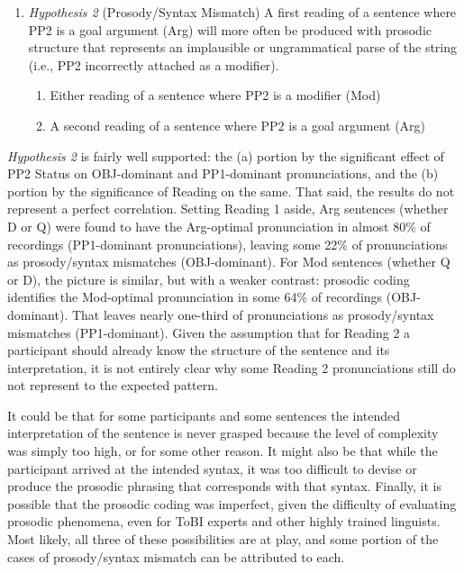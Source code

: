 \documentclass[11pt,oneside]{book}
\providecommand{\tightlist}{%
  \setlength{\itemsep}{0pt}\setlength{\parskip}{0pt}}
\begin{document}
\begin{enumerate}
\def\labelenumi{(\arabic{enumi})}
\setcounter{enumi}{42}
\tightlist
\item
  \emph{Hypothesis 2} (Prosody/Syntax Mismatch)\linebreak\nopagebreak
  A first reading of a sentence where PP2 is a goal argument (Arg) will more often be produced with prosodic structure that represents an implausible or ungrammatical parse of the string (i.e., PP2 incorrectly attached as a modifier).

  \begin{enumerate}
  \def\labelenumii{\alph{enumii}.}
  \tightlist
  \item
    Either reading of a sentence where PP2 is a modifier (Mod)
  \item
    A second reading of a sentence where PP2 is a goal argument (Arg)
  \end{enumerate}
\end{enumerate}

\emph{Hypothesis 2} is fairly well supported: the (a) portion by the significant effect of PP2 Status on OBJ-dominant and PP1-dominant pronunciations, and the (b) portion by the significance of Reading on the same. That said, the results do not represent a perfect correlation. Setting Reading 1 aside, Arg sentences (whether D or Q) were found to have the Arg-optimal pronunciation in almost 80\% of recordings (PP1-dominant pronunciations), leaving some 22\% of pronunciations as prosody/syntax mismatches (OBJ-dominant). For Mod sentences (whether Q or D), the picture is similar, but with a weaker contrast: prosodic coding identifies the Mod-optimal pronunciation in some 64\% of recordings (OBJ-dominant). That leaves nearly one-third of pronunciations as prosody/syntax mismatches (PP1-dominant). Given the assumption that for Reading 2 a participant should already know the structure of the sentence and its interpretation, it is not entirely clear why some Reading 2 pronunciations still do not represent to the expected pattern.

It could be that for some participants and some sentences the intended interpretation of the sentence is never grasped because the level of complexity was simply too high, or for some other reason. It might also be that while the participant arrived at the intended syntax, it was too difficult to devise or produce the prosodic phrasing that corresponds with that syntax. Finally, it is possible that the prosodic coding was imperfect, given the difficulty of evaluating prosodic phenomena, even for ToBI experts and other highly trained linguists. Most likely, all three of these possibilities are at play, and some portion of the cases of prosody/syntax mismatch can be attributed to each.
\end{document}
